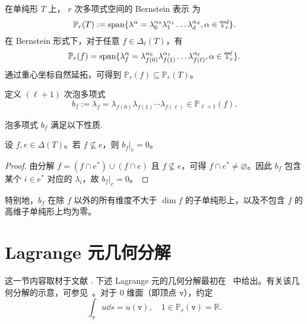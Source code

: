 在单纯形 $T$ 上， $r$ 次多项式空间的 Bernstein 表示 为
\[
\mathbb P_r(T) :={\rm span}\{ \lambda^{\alpha} = \lambda_{0}^{\alpha_0}\lambda_{1}^{\alpha_1}\ldots \lambda_{d}^{\alpha_d}, \alpha\in \mathbb T_r^{d}\}.
\]
在 Bernstein 形式下，对于任意 $f \in \Delta_\ell(T)$，有
\[
\mathbb P_r(f) ={\rm span}\{ \lambda_{f}^{\alpha} = \lambda_{f(0)}^{\alpha_0}\lambda_{f(1)}^{\alpha_1}\ldots \lambda_{f(\ell)}^{\alpha_{\ell}},  \alpha \in \mathbb T_r^{\ell}\}.
\]
通过重心坐标自然延拓，可得到 $\mathbb{P}_r(f) \subseteq \mathbb{P}_r(T)$。

定义 $(\ell+1)$ 次泡多项式
\[
b_f := \lambda_f = \lambda_{f(0)} \lambda_{f(1)} \cdots \lambda_{f(\ell)} \in \mathbb{P}_{\ell+1}(f).
\]

泡多项式 $b_f$ 满足以下性质.

\begin{lemma}\label{lm:bf}
设 $f,e \in \Delta(T)$。若 $f \not\subseteq e$，则 $b_f|_e = 0$。
\end{lemma}

\begin{proof}
由分解 $f = (f \cap e^*) \cup (f \cap e)$ 且 $f \not\subseteq e$，可得 $f \cap e^* \neq \varnothing$。因此 $b_f$ 包含某个 $i \in e^*$ 对应的 $\lambda_i$，故 $b_f|_e = 0$。
\end{proof}

特别地，$b_f$ 在除 $f$ 以外的所有维度不大于 $\dim f$ 的子单纯形上，以及不包含 $f$ 的高维子单纯形上均为零。




\section{Lagrange 元几何分解}\label{sec:geodecompLagrange}
这一节内容取材于文献 \cite{ChenHuang2024a,ChenChenHuangWei2024}. %
下述 Lagrange 元的几何分解最初在~\cite[(2.6)]{ArnoldFalkWinther2009} 中给出。有关该几何分解的示意，可参见~\cite[Fig. 2.1]{ArnoldFalkWinther2009}。对于 $0$ 维面（即顶点 $\texttt{v}$），约定
$$
\int_{\texttt{v}} u \dd s = u(\texttt{v}), \quad 1\in \mathbb P_r(\texttt{v})=\mathbb R.
$$

